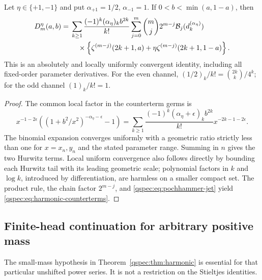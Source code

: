 \begin{theorem}
\label{qspec:thm:harmonic}
Let $\eta\in\{+1,-1\}$ and put $\alpha_{+1}=1/2$, $\alpha_{-1}=1$.
If $0<b<\min(a,1-a)$, then
\begin{align}
D_m^\eta(a,b)={}&\sum_{k\ge1}
 \frac{(-1)^k(\alpha_\eta)_k b^{2k}}{k!}
 \sum_{j=0}^m\binom mj 2^{m-j}\mathcal B_j(d_k^{(\alpha_\eta)})\notag\\
&\quad\times\left\{\zeta^{(m-j)}(2k+1,a)
       +\eta\zeta^{(m-j)}(2k+1,1-a)\right\}.
\label{qspec:eq:harmonic-counterterms}
\end{align}
This is an absolutely and locally uniformly convergent identity, including
all fixed-order parameter derivatives. For the even channel,
$(1/2)_k/k!=\binom{2k}{k}/4^k$; for the odd channel $(1)_k/k!=1$.
\end{theorem}
\begin{proof}
The common local factor in the counterterm germs is
\[
x^{-1-2\epsilon}\left((1+b^2/x^2)^{-\alpha_\eta-\epsilon}-1\right)
=\sum_{k\ge1}\frac{(-1)^k(\alpha_\eta+\epsilon)_k b^{2k}}{k!}
 x^{-2k-1-2\epsilon}.
\]
The binomial expansion converges uniformly with a geometric ratio strictly
less than one for $x=x_n,y_n$ and the stated parameter range. Summing in
$n$ gives the two Hurwitz terms. Local uniform convergence also follows
directly by bounding each Hurwitz tail with its leading geometric scale;
polynomial factors in $k$ and $\log k$, introduced by differentiation,
are harmless on a smaller compact set. The product rule, the chain factor
$2^{m-j}$, and \eqref{qspec:eq:pochhammer-jet} yield
\eqref{qspec:eq:harmonic-counterterms}.
\end{proof}

\subsection{Finite-head continuation for arbitrary positive mass}
The small-mass hypothesis in Theorem~\ref{qspec:thm:harmonic} is essential
for that particular unshifted power series. It is not a restriction on
the Stieltjes identities.

